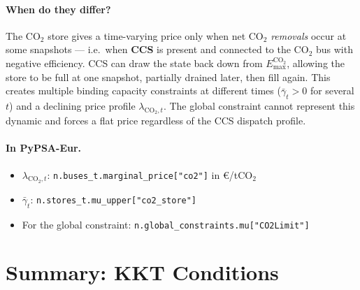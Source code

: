 \documentclass{article}
\begin{document}
\paragraph{When do they differ?}
The CO$_2$ store gives a time-varying price only when net CO$_2$ \emph{removals}
occur at some snapshots --- i.e.\ when \textbf{CCS} is present and connected to
the CO$_2$ bus with negative efficiency.
CCS can draw the state back down from $E^{\text{CO}_2}_{\max}$, allowing the
store to be full at one snapshot, partially drained later, then fill again.
This creates multiple binding capacity constraints at different times
($\bar{\gamma}_t > 0$ for several $t$) and a declining price profile
$\lambda_{\text{CO}_2,t}$.
The global constraint cannot represent this dynamic and forces a flat price
regardless of the CCS dispatch profile.

\paragraph{In PyPSA-Eur.}
\begin{itemize}
    \item $\lambda_{\text{CO}_2, t}$: \texttt{n.buses\_t.marginal\_price["co2"]}
          in \euro/tCO$_2$
    \item $\bar{\gamma}_t$: \texttt{n.stores\_t.mu\_upper["co2\_store"]}
    \item For the global constraint: \texttt{n.global\_constraints.mu["CO2Limit"]}
\end{itemize}

\section{Summary: KKT Conditions}
\label{sec:summary}
\end{document}
